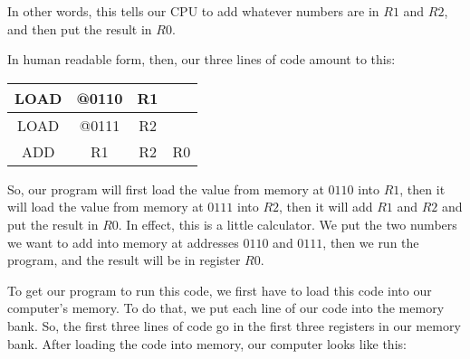\documentclass[../../../main.tex]{subfiles}
\begin{document}
In other words, this tells our CPU to add whatever numbers are in $R1$ and $R2$, and then put the result in $R0$. 

In human readable form, then, our three lines of code amount to this:

\begin{center}
  \begin{tabular}{c c c c}
    \hline
    LOAD & @0110 & R1 & ~ \\ \hline
    LOAD & @0111 & R2 & ~ \\ \hline
    ADD & R1 & R2 & R0 \\ \hline
  \end{tabular}
\end{center}

So, our program will first load the value from memory at $0110$ into $R1$, then it will load the value from memory at $0111$ into $R2$, then it will add $R1$ and $R2$ and put the result in $R0$. In effect, this is a little calculator. We put the two numbers we want to add into memory at addresses $0110$ and $0111$, then we run the program, and the result will be in register $R0$.

To get our program to run this code, we first have to load this code into our computer's memory. To do that, we put each line of our code into the memory bank. So, the first three lines of code go in the first three registers in our memory bank. After loading the code into memory, our computer looks like this: 
\end{document}
